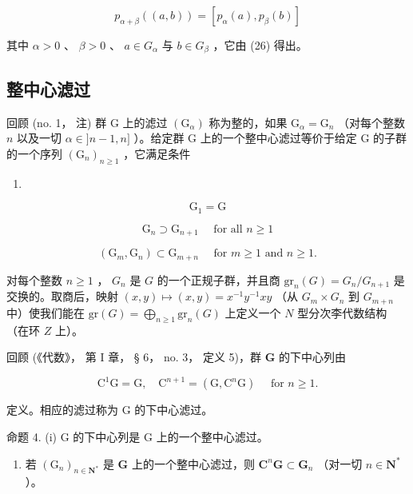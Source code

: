 \[
p _ {\alpha + \beta} ((a, b)) = [ p _ {\alpha} (a), p _ {\beta} (b) ]\tag{27}
\]

其中 \(\alpha > 0\) 、 \(\beta > 0\) 、 \(a \in G_{\alpha}\) 与 \(b \in G_{\beta}\) ，它由 (26) 得出。

\subsection{整中心滤过}

回顾 (no. 1， 注) 群 G 上的滤过 \((\mathrm{G}_{\alpha})\) 称为整的，如果 \(\mathrm{G}_{\alpha} = \mathrm{G}_{n}\) （对每个整数 \(n\) 以及一切 \(\alpha \in ]n - 1,n]\) ）。给定群 G 上的一个整中心滤过等价于给定 G 的子群的一个序列 \((\mathrm{G}_n)_{n\geqslant 1}\) ，它满足条件

\begin{enumerate}
\def\labelenumi{(\roman{enumi})}
\tightlist
\item
\end{enumerate}

\[
\mathrm{G} _ {1} = \mathrm{G}\tag{i}
\]

\[
\mathrm{G} _ {n} \supset \mathrm{G} _ {n + 1} \quad \text { for   all } n \geqslant 1\tag{ii}
\]

\[
\left(\mathrm{G} _ {m}, \mathrm{G} _ {n}\right) \subset \mathrm{G} _ {m + n} \quad \text { for } m \geqslant 1 \text { and } n \geqslant 1.\tag{iii}
\]

对每个整数 \(n \geqslant 1\) ， \(G_n\) 是 \(G\) 的一个正规子群，并且商 \(\mathrm{gr}_n(G) = G_n / G_{n+1}\) 是交换的。取商后，映射 \((x,y) \mapsto (x,y) = x^{-1}y^{-1}xy\) （从 \(G_m \times G_n\) 到 \(G_{m+n}\) 中）使我们能在 \(\mathrm{gr}(G) = \bigoplus_{n \geqslant 1} \mathrm{gr}_n(G)\) 上定义一个 \(N\) 型分次李代数结构（在环 \(Z\) 上）。

回顾 (《代数》， 第 I 章， § 6， no. 3， 定义 5)，群 \(\mathbf{G}\) 的下中心列由

\[
\mathrm{C} ^ {1} \mathrm{G} = \mathrm{G}, \quad \mathrm{C} ^ {n + 1} = (\mathrm{G}, \mathrm{C} ^ {n} \mathrm{G}) \quad \text { for } n \geqslant 1.\tag{28}
\]

定义。相应的滤过称为 G 的下中心滤过。

命题 4. (i) G 的下中心列是 G 上的一个整中心滤过。

\begin{enumerate}
\def\labelenumi{(\roman{enumi})}
\setcounter{enumi}{1}
\tightlist
\item
  若 \((\mathrm{G}_n)_{n\in \mathbf{N}^*}\) 是 \(\mathbf{G}\) 上的一个整中心滤过，则 \(\mathbf{C}^n\mathbf{G}\subset \mathbf{G}_n\) （对一切 \(n\in \mathbf{N}^*\) ）。
\end{enumerate}

